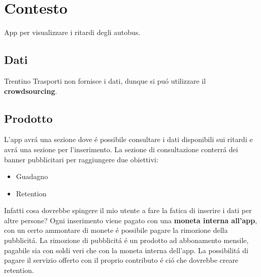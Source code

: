 \chapter{Contesto}

App per visualizzare i ritardi degli autobus.

\section{Dati}
Trentino Trasporti non fornisce i dati, dunque si pu\'o utilizzare il \textbf{crowdsourcing}.

\section{Prodotto}
L’app avr\'a una sezione dove \'e possibile consultare i dati disponibili sui 
ritardi e avr\'a una sezione per l’inserimento.
La sezione di consultazione conterr\'a dei banner pubblicitari per raggiungere due obiettivi:
\begin{itemize}
	\item Guadagno\\
	\item Retention\\
\end{itemize}
Infatti cosa dovrebbe spingere il mio utente a fare la fatica di inserire i dati per altre persone?
Ogni inserimento viene pagato con una \textbf{moneta interna all’app}, con un certo ammontare di monete 
\'e possibile pagare la rimozione della pubblicit\'a.
La rimozione di pubblicit\'a \'e un prodotto ad abbonamento mensile, pagabile sia con soldi veri che 
con la moneta interna dell’app. La possibilit\'a di pagare il servizio offerto con il proprio 
contributo \'e ci\'o che dovrebbe creare retention.

